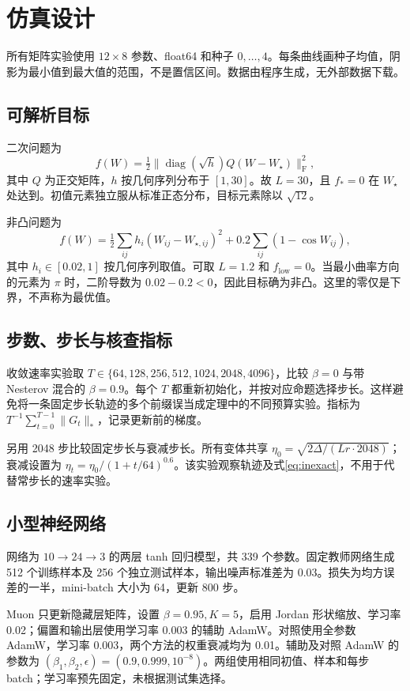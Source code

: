 \documentclass[11pt,a4paper]{article}
\theoremstyle{definition}
\newcommand{\F}{\mathrm{F}}
\begin{document}
\section{仿真设计}
所有矩阵实验使用 $12\times8$ 参数、float64 和种子 $0,\ldots,4$。每条曲线画种子均值，阴影为最小值到最大值的范围，不是置信区间。数据由程序生成，无外部数据下载。

\subsection{可解析目标}
二次问题为
\[
 f(W)=\tfrac12\|\operatorname{diag}(\sqrt h)Q(W-W_\star)\|_\F^2,
\]
其中 $Q$ 为正交矩阵，$h$ 按几何序列分布于 $[1,30]$。故 $L=30$，且 $f_*=0$ 在 $W_\star$ 处达到。初值元素独立服从标准正态分布，目标元素除以 $\sqrt{12}$。

非凸问题为
\[
 f(W)=\tfrac12\sum_{ij}h_i(W_{ij}-W_{\star,ij})^2
       +0.2\sum_{ij}(1-\cos W_{ij}),
\]
其中 $h_i\in[0.02,1]$ 按几何序列取值。可取 $L=1.2$ 和 $f_{\mathrm{low}}=0$。当最小曲率方向的元素为 $\pi$ 时，二阶导数为 $0.02-0.2<0$，因此目标确为非凸。这里的零仅是下界，不声称为最优值。

\subsection{步数、步长与核查指标}
收敛速率实验取 $T\in\{64,128,256,512,1024,2048,4096\}$，比较 $\beta=0$ 与带 Nesterov 混合的 $\beta=0.9$。每个 $T$ 都重新初始化，并按对应命题选择步长。这样避免将一条固定步长轨迹的多个前缀误当成定理中的不同预算实验。指标为
$T^{-1}\sum_{t=0}^{T-1}\|G_t\|_*$，记录更新前的梯度。

另用 2048 步比较固定步长与衰减步长。所有变体共享
$\eta_0=\sqrt{2\Delta/(Lr\cdot2048)}$；衰减设置为
$\eta_t=\eta_0/(1+t/64)^{0.6}$。该实验观察轨迹及式\eqref{eq:inexact}，不用于代替常步长的速率实验。

\subsection{小型神经网络}
网络为 $10\to24\to3$ 的两层 tanh 回归模型，共 339 个参数。固定教师网络生成 512 个训练样本及 256 个独立测试样本，输出噪声标准差为 0.03。损失为均方误差的一半，mini-batch 大小为 64，更新 800 步。

Muon 只更新隐藏层矩阵，设置 $\beta=0.95,K=5$，启用 Jordan 形状缩放、学习率 0.02；偏置和输出层使用学习率 0.003 的辅助 AdamW。对照使用全参数 AdamW，学习率 0.003，两个方法的权重衰减均为 0.01。辅助及对照 AdamW 的参数为 $(\beta_1,\beta_2,\epsilon)=(0.9,0.999,10^{-8})$。两组使用相同初值、样本和每步 batch；学习率预先固定，未根据测试集选择。
\end{document}
